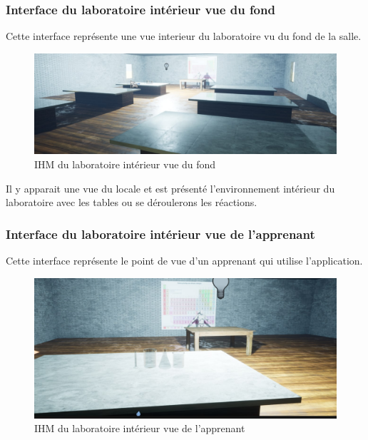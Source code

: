 \subsubsection{Interface du laboratoire intérieur vue du fond}

Cette interface représente une vue interieur du laboratoire vu du fond de la salle.

\begin{figure}[H]
	\centering
	\includegraphics[width=1\textwidth]{img/labo1}
	\caption{IHM du laboratoire intérieur vue du fond}
	\label{fig:mesh1}
\end{figure}

Il y apparait une vue du locale et est présenté l'environnement intérieur du laboratoire avec les tables ou se déroulerons les réactions.

\subsubsection{Interface du laboratoire intérieur vue de l'apprenant}

Cette interface représente le point de vue d'un apprenant qui utilise l'application.

\begin{figure}[H]
	\centering
	\includegraphics[width=1\textwidth]{img/labo2}
	\caption{IHM du laboratoire intérieur vue de l'apprenant}
	\label{fig:mesh1}
\end{figure}

